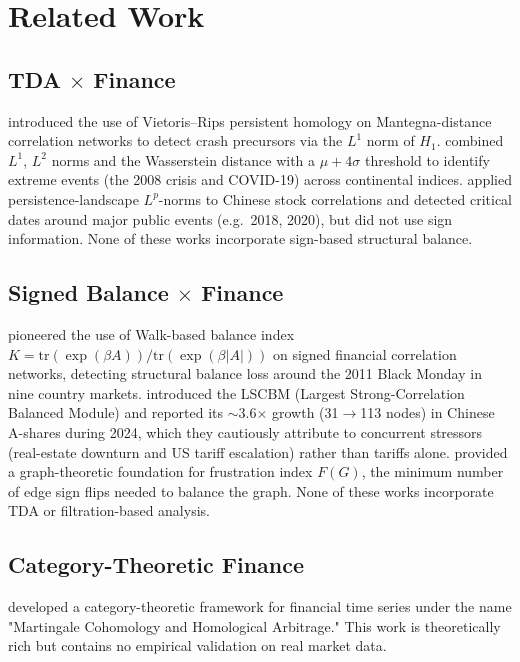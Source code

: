 \documentclass[11pt]{article}
\begin{document}
\section{Related Work}

\subsection{TDA $\times$ Finance}

\citet{gidea2017topological} introduced the use of Vietoris--Rips persistent
homology on Mantegna-distance \citep{mantegna1999hierarchical} correlation
networks to detect crash precursors via the $L^1$ norm of $H_1$.
\citet{majumdar2024multi} combined $L^1$, $L^2$ norms and the Wasserstein
distance with a $\mu+4\sigma$ threshold to identify extreme events (the 2008
crisis and COVID-19) across continental indices. \citet{wang2023tda} applied
persistence-landscape $L^p$-norms to Chinese stock correlations and detected
critical dates around major public events (e.g.\ 2018, 2020), but did not use
sign information. None of these works incorporate sign-based structural balance.

\subsection{Signed Balance $\times$ Finance}

\citet{ferreira2021loss} pioneered the use of Walk-based balance index
$K = \mathrm{tr}(\exp(\beta A)) / \mathrm{tr}(\exp(\beta |A|))$ \citep{estrada2014walk}
on signed financial correlation networks, detecting structural balance loss
around the 2011 Black Monday in nine country markets. \citet{wang2025core}
introduced the LSCBM (Largest Strong-Correlation Balanced Module) and reported
its $\sim$3.6$\times$ growth (31$\to$113 nodes) in Chinese A-shares during 2024,
which they cautiously attribute to concurrent stressors (real-estate downturn and
US tariff escalation) rather than tariffs alone. \citet{aref2018frustration} provided a graph-theoretic foundation
for frustration index $F(G)$, the minimum number of edge sign flips needed to
balance the graph. None of these works incorporate TDA or filtration-based
analysis.

\subsection{Category-Theoretic Finance}

\citet{adachi2026martingale} developed a category-theoretic framework for
financial time series under the name "Martingale Cohomology and Homological
Arbitrage." This work is theoretically rich but contains no empirical validation
on real market data.
\end{document}
